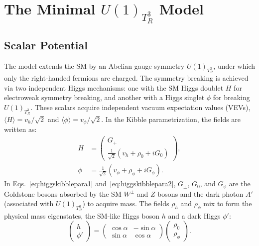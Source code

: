 \section{The Minimal $U(1)_{T_R^3}$ Model}\label{sec:model}

\subsection{Scalar Potential}

The model extends the SM by an Abelian gauge symmetry $U(1)_{T^3_R}$, under which only the right-handed fermions are charged. The symmetry breaking is achieved via two independent Higgs mechanisms: one with the SM Higgs doublet $H$ for electroweak symmetry breaking, and another with a Higgs singlet $\phi$ for breaking $U(1)_{T^3_R}$. These scalars acquire independent vacuum expectation values (VEVs), $\langle H \rangle = v_h / \sqrt{2}$ and $\langle \phi \rangle = v_\phi / \sqrt{2}$. In the Kibble parametrization, the fields are written as:
\begin{align}
    H & = \begin{pmatrix}
        G_{+} \\
        \frac{1}{\sqrt{2}}\left(v_h + \rho_0 + i G_{0}\right)
    \end{pmatrix}, \label{eq:higgskibblepara1} \\
    \phi & = \frac{1}{\sqrt{2}}\left(v_\phi + \rho_\phi + i G_{\phi}\right). \label{eq:higgskibblepara2}
\end{align}
In Eqs.~\eqref{eq:higgskibblepara1} and~\eqref{eq:higgskibblepara2}, $G_\pm$, $G_0$, and $G_\phi$ are the Goldstone bosons absorbed by the SM $W^\pm$ and $Z$ bosons and the dark photon $A'$ (associated with $U(1)_{T^3_R}$) to acquire mass. The fields $\rho_h$ and $\rho_\phi$ mix to form the physical mass eigenstates, the SM-like Higgs boson $h$ and a dark Higgs $\phi'$:
\begin{equation}
    \begin{pmatrix}
        h \\
        \phi'
    \end{pmatrix}
    =
    \begin{pmatrix}
        \cos\alpha & -\sin\alpha \\
        \sin\alpha & \cos\alpha
    \end{pmatrix}
    \begin{pmatrix}
        \rho_0 \\
        \rho_\phi
    \end{pmatrix}.
\end{equation}
